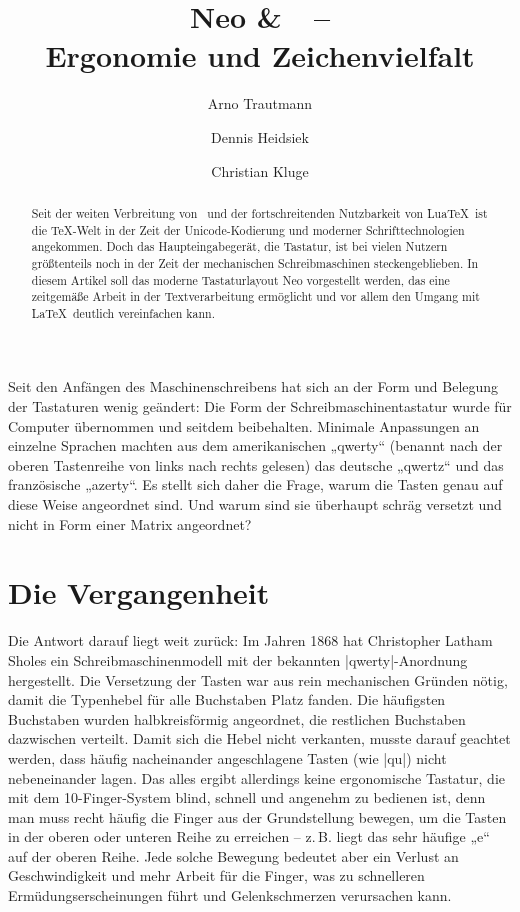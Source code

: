 \documentclass[ngerman]{dtk}
\title{Neo \&\ \XeLaTeX\ –\\ Ergonomie und Zeichenvielfalt}
\author{Arno Trautmann\and Dennis Heidsiek\and Christian Kluge}
\newcommand\LuaTeX{Lua\TeX}
\begin{document}
\maketitle
\begin{abstract}
Seit der weiten Verbreitung von \XeTeX\ und der fortschreitenden Nutzbarkeit von \LuaTeX\ ist die \TeX-Welt in der Zeit der Unicode-Kodierung und moderner Schrifttechnologien angekommen. Doch das Haupteingabegerät, die Tastatur, ist bei vielen Nutzern größtenteils noch in der Zeit der mechanischen Schreibmaschinen steckengeblieben. In diesem Artikel soll das moderne Tastaturlayout Neo vorgestellt werden, das eine zeitgemäße Arbeit in der Textverarbeitung ermöglicht und vor allem den Umgang mit \LaTeX\ deutlich vereinfachen kann.
\end{abstract}
Seit den Anfängen des Maschinenschreibens hat sich an der Form und Belegung der Tastaturen wenig geändert: Die Form der Schreibmaschinentastatur wurde für Computer übernommen und seitdem beibehalten. Minimale Anpassungen an einzelne Sprachen machten aus dem amerikanischen „\hbox{qwerty}“ (benannt nach der oberen Tastenreihe von links nach rechts gelesen) das deutsche „qwertz“ und das französische „azerty“. Es stellt sich daher die Frage, warum die Tasten genau auf diese Weise angeordnet sind. Und warum sind sie überhaupt schräg versetzt und nicht in Form einer Matrix angeordnet?

\section{Die Vergangenheit}
Die Antwort darauf liegt weit zurück: Im Jahren 1868 hat Christopher Latham Sholes ein Schreibmaschinenmodell mit der bekannten |qwerty|-Anordnung hergestellt. \cite{patentqwerty} Die Versetzung der Tasten war aus rein mechanischen Gründen nötig, damit die Typenhebel für alle Buchstaben Platz fanden. Die häufigsten Buchstaben wurden halbkreisförmig angeordnet, die restlichen Buchstaben dazwischen verteilt. Damit sich die Hebel nicht verkanten, musste darauf geachtet werden, dass häufig nacheinander angeschlagene Tasten (wie |qu|) nicht nebeneinander lagen. Das alles ergibt allerdings keine ergonomische Tastatur, die mit dem 10-Finger-System blind, schnell und angenehm zu bedienen ist, denn man muss recht häufig die Finger aus der Grundstellung bewegen, um die Tasten in der oberen oder unteren Reihe zu erreichen – z.\,B. liegt das sehr häufige „e“ auf der oberen Reihe. Jede solche Bewegung bedeutet aber ein Verlust an Geschwindigkeit und mehr Arbeit für die Finger, was zu schnelleren Ermüdungserscheinungen führt und Gelenkschmerzen verursachen kann.
\end{document}
